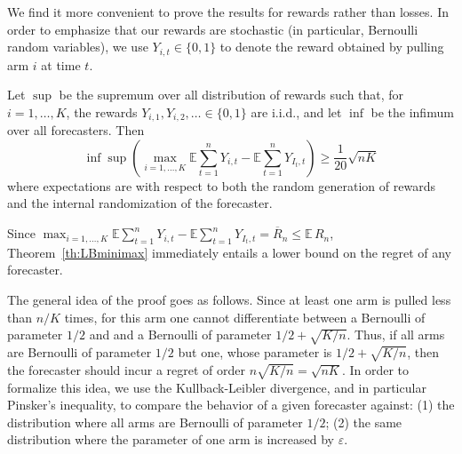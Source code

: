 \documentclass[11pt]{hackednow}
\newcommand{\E}{\mathbb{E}}
\newcommand{\oR}{\overline{R}}
\renewcommand{\epsilon}{\varepsilon}
\begin{document}
We find it more convenient to prove the results for rewards rather than losses. In order to emphasize that our rewards are stochastic (in particular, Bernoulli random variables), we use $Y_{i,t}\in\{0,1\}$ to denote the reward obtained by pulling arm $i$ at time $t$.
\begin{theorem} \label{th:LBminimax}
Let $\sup$ be the supremum over all distribution of rewards such that, for $i=1,\dots,K$, the rewards $Y_{i,1},Y_{i,2},\ldots\in\{0,1\}$ are i.i.d., and let $\inf$ be the infimum over all forecasters. Then
\begin{equation} \label{eq:LBminimax}
\inf \sup \left(\max_{i=1,\hdots,K} \E \sum_{t=1}^n Y_{i,t} - \E \sum_{t=1}^n Y_{I_t,t} \right) \geq \frac{1}{20} \sqrt{n K}
\end{equation}
where expectations are with respect to both the random generation of rewards and the internal randomization of the forecaster.
\end{theorem}
Since $\max_{i=1,\hdots,K} \E \sum_{t=1}^n Y_{i,t} - \E \sum_{t=1}^n Y_{I_t,t} = \oR_n \le \E\,R_n$, Theorem~\ref{th:LBminimax} immediately entails a lower bound on the regret of any forecaster.

The general idea of the proof goes as follows. Since at least one arm is pulled less than $n/K$ times, for this arm one cannot differentiate between a Bernoulli of parameter $1/2$ and and a Bernoulli of parameter $1/2+\sqrt{K/n}$. Thus, if all arms are Bernoulli of parameter $1/2$ but one, whose parameter is $1/2+\sqrt{K/n}$, then the forecaster should incur a regret of order $n \sqrt{K/n} = \sqrt{n K}$. In order to formalize this idea, we use the Kullback-Leibler divergence, and in particular Pinsker's inequality, to compare the behavior of a given forecaster against: (1) the distribution where all arms are Bernoulli of parameter $1/2$; (2) the same distribution where the parameter of one arm is increased by $\epsilon$. 
\end{document}

